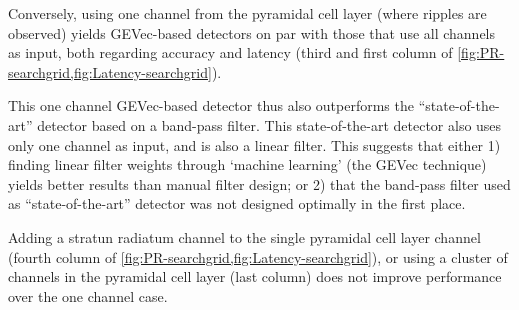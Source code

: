 Conversely, using one channel from the pyramidal cell layer (where ripples are observed) yields GEVec-based detectors on par with those that use all channels as input, both regarding accuracy and latency (third and first column of \cref{fig:PR-searchgrid,fig:Latency-searchgrid}).

This one channel GEVec-based detector thus also outperforms the ``state-of-the-art'' detector based on a band-pass filter. This state-of-the-art detector also uses only one channel as input, and is also a linear filter. This suggests that either 1) finding linear filter weights through `machine learning' (the GEVec technique) yields better results than manual filter design; or 2) that the band-pass filter used as ``state-of-the-art'' detector was not designed optimally in the first place.

Adding a stratun radiatum channel to the single pyramidal cell layer channel (fourth column of \cref{fig:PR-searchgrid,fig:Latency-searchgrid}), or using a cluster of channels in the pyramidal cell layer (last column) does not improve performance over the one channel case.
